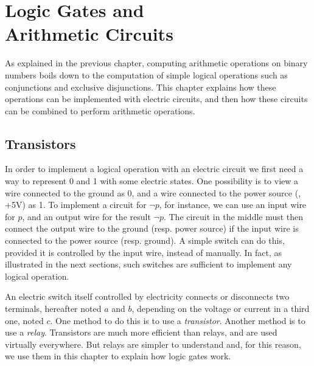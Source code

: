 
\chapter[Logic Gates and Arithmetic Circuits]
  {Logic Gates and\\ Arithmetic Circuits}\label{chapter:logic-gates}

As explained in the previous chapter, computing arithmetic operations on binary
numbers boils down to the computation of simple logical operations such as
conjunctions and exclusive disjunctions. This chapter explains how these
operations can be implemented with electric circuits, and then how these
circuits can be combined to perform arithmetic operations.

\section{Transistors}

In order to implement a logical operation with an electric circuit we first
need a way to represent 0 and 1 with some electric states. One possibility is
to view a wire connected to the ground as 0, and a wire connected to the power
source (\eg, +5V) as 1. To implement a circuit for $\neg p$, for instance,
we can use an input wire for $p$, and an output wire for the result $\neg p$.
The circuit in the middle must then connect the output wire to the ground
(resp. power source) if the input wire is connected to the power source (resp.
ground). A simple switch can do this, provided it is controlled by the input
wire, instead of manually. In fact, as illustrated in the next sections, such
switches are sufficient to implement any logical operation.

An electric switch itself controlled by electricity connects or disconnects two
terminals, hereafter noted $a$ and $b$, depending on the voltage or current in
a third one, noted $c$. One method to do this is to use a {\em transistor}.
Another method is to use a {\em relay}. Transistors are much more efficient
than relays, and are used virtually everywhere. But relays are simpler to
understand and, for this reason, we use them in this chapter to explain how
logic gates work.

